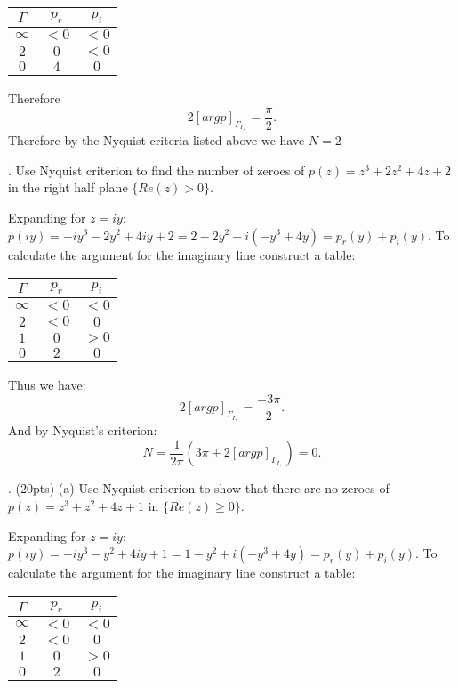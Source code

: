 \documentclass[letterpaper, reqno,11pt]{article}
\begin{document}
\begin{table}[htpb]
    \centering
    \label{tab:q4}
    \begin{tabular}{c|c|c}
        $\Gamma$&$p_r$&$p_i$\\
        \hline
        $\infty$&$<0$&$<0$\\
        $2$ &$0$& $<0$\\
        $0$&$4$& $0$
    \end{tabular}
\end{table}
Therefore 
\[
2[arg p]_{\Gamma_{I_+}}=\frac{\pi}{2}
.\]
Therefore by the Nyquist criteria listed above we have $N=2$


\medskip

. Use Nyquist criterion to find the number of zeroes of $ p(z)= z^3+2z^2+4z +2$ in the right half plane $ \{ Re(z)>0\}$.

Expanding for $z=iy$: $p(iy)=-iy^3-2y^2+4iy+2=2-2y^2+i(-y^3+4y)=p_r(y)+p_i(y)$. To calculate the argument for the imaginary line construct a table: 

\begin{table}[htpb]
    \centering
    \label{tab:q4}
    \begin{tabular}{c|c|c}
        $\Gamma$&$p_r$&$p_i$\\
        \hline
        $\infty$&$<0$&$<0$\\
        $2$ &$<0$& $0$\\
        $1$ &$0$& $>0$\\
        $0$&$2$& $0$
    \end{tabular}
\end{table}

Thus we have: 
\[
2[arg p]_{\Gamma_{I_+}}=\frac{-3\pi}{2}
.\]
And by Nyquist's criterion: 
\[
N=\frac{1}{2\pi}\left( 3\pi+2[arg p]_{\Gamma_{I_+}} \right)=0
.\]

\medskip

. (20pts)  (a) Use Nyquist criterion to show that there are no zeroes of $ p(z)= z^3+z^2+4z+1$ in  $\{ Re(z) \geq 0\}$.


Expanding for $z=iy$: $p(iy)=-iy^3-y^2+4iy+1=1-y^2+i(-y^3+4y)=p_r(y)+p_i(y)$. To calculate the argument for the imaginary line construct a table: 

\begin{table}[htpb]
    \centering
    \label{tab:q4}
    \begin{tabular}{c|c|c}
        $\Gamma$&$p_r$&$p_i$\\
        \hline
        $\infty$&$<0$&$<0$\\
        $2$ &$<0$& $0$\\
        $1$ &$0$& $>0$\\
        $0$&$2$& $0$
    \end{tabular}
\end{table}
\end{document}
